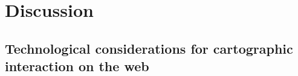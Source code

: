 \section{Discussion}






\subsection{Technological considerations for cartographic interaction on the web}

